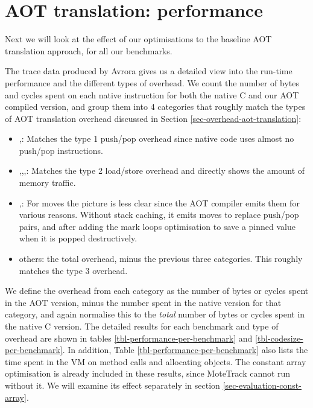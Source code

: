 


\section{AOT translation: performance}
\label{sec-evaluation-aot-translation-performance}

Next we will look at the effect of our optimisations to the baseline AOT translation approach, for all our benchmarks.

The trace data produced by Avrora gives us a detailed view into the run-time performance and the different types of overhead. We count the number of bytes and cycles spent on each native instruction for both the native C and our AOT compiled version, and group them into 4 categories that roughly match the types of AOT translation overhead discussed in Section \ref{sec-overhead-aot-translation}:
\begin{itemize}
	\item {},: Matches the type 1 push/pop overhead since native code uses almost no push/pop instructions.
	\item {},,,: Matches the type 2 load/store overhead and directly shows the amount of memory traffic.
	\item {},: For moves the picture is less clear since the AOT compiler emits them for various reasons. Without stack caching, it emits moves to replace push/pop pairs, and after adding the mark loops optimisation to save a pinned value when it is popped destructively.
	\item others: the total overhead, minus the previous three categories. This roughly matches the type 3 overhead.
\end{itemize}

We define the overhead from each category as the number of bytes or cycles spent in the AOT version, minus the number spent in the native version for that category, and again normalise this to the \emph{total} number of bytes or cycles spent in the native C version. The detailed results for each benchmark and type of overhead are shown in tables \ref{tbl-performance-per-benchmark} and \ref{tbl-codesize-per-benchmark}. In addition, Table \ref{tbl-performance-per-benchmark} also lists the time spent in the VM on method calls and allocating objects. The constant array optimisation is already included in these results, since MoteTrack cannot run without it. We will examine its effect separately in section \ref{sec-evaluation-const-array}.

